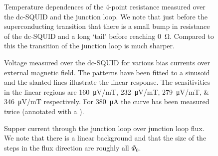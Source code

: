 \begin{figure}[h]
	\centering
	
	\caption{Temperature dependences of the 4-point resistance measured over the dc-SQUID and the junction loop. We note that just before the superconducting transition that there is a small bump in resistance of the dc-SQUID and a long `tail' before reaching \qty{0}{\ohm}. Compared to this the transition of the junction loop is much sharper.}
	\label{fig:CP2.6B_RT_curves}
\end{figure}


\begin{figure}[h]
	\centering
	
	\caption{Voltage measured over the dc-SQUID for various bias currents over external magnetic field. The patterns have been fitted to a sinusoid and the slanted lines illustrate the linear response. The sensitivities in the linear regions are \qtylist{160;232;279;346}{\micro\volt/\milli\tesla} respectively. For \qty{380}{\micro\ampere} the curve has been measured twice (annotated with a \dag).}
	\label{fig:CP2.6B_SQUID_calibration_curves}
\end{figure}


\begin{figure}[h]
	\centering
	
	\caption{Supper current through the junction loop over junction loop flux. We note that there is a linear background and that the size of the steps in the flux direction are roughly all $\Phi_0$.}
	\label{fig:CP2.6B_super_current_over_loop_flux}
\end{figure}


